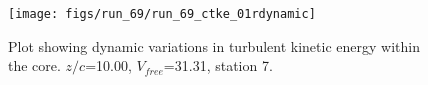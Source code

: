 \begin{figure}[H]
\centering
\texttt{[image: figs/run\_69/run\_69\_ctke\_01rdynamic]}
\caption{Plot showing dynamic variations in turbulent kinetic energy within the core. $z/c$=10.00, $V_{free}$=31.31, station 7.}
\end{figure}


